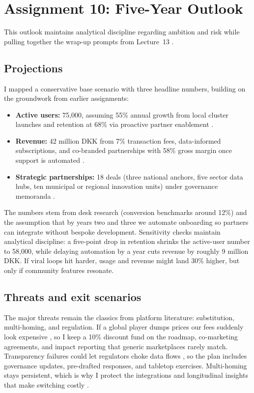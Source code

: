 \section*{Assignment 10: Five-Year Outlook}

This outlook maintains analytical discipline regarding ambition and risk while pulling together the wrap-up prompts from Lecture~13 \citep{Lecture13}.

\subsection*{Projections}
I mapped a conservative base scenario with three headline numbers, building on the groundwork from earlier assignments:
\begin{itemize}
  \item \textbf{Active users:} 75,000, assuming 55\% annual growth from local cluster launches and retention at 68\% via proactive partner enablement \citep{Choudary2016,Srnicek2017}.
  \item \textbf{Revenue:} 42 million DKK from 7\% transaction fees, data-informed subscriptions, and co-branded partnerships with 58\% gross margin once support is automated \citep{ShapiroVarian1999}.
  \item \textbf{Strategic partnerships:} 18 deals (three national anchors, five sector data hubs, ten municipal or regional innovation units) under governance memoranda \citep{Reillier2017}.
\end{itemize}

The numbers stem from desk research (conversion benchmarks around 12\%) and the assumption that by years two and three we automate onboarding so partners can integrate without bespoke development. Sensitivity checks maintain analytical discipline: a five-point drop in retention shrinks the active-user number to 58,000, while delaying automation by a year cuts revenue by roughly 9 million DKK. If viral loops hit harder, usage and revenue might land 30\% higher, but only if community features resonate.

\subsection*{Threats and exit scenarios}
The major threats remain the classics from platform literature: substitution, multi-homing, and regulation. If a global player dumps prices our fees suddenly look expensive \citep{Porter2008}, so I keep a 10\% discount fund on the roadmap, co-marketing agreements, and impact reporting that generic marketplaces rarely match. Transparency failures could let regulators choke data flows \citep{Srnicek2017}, so the plan includes governance updates, pre-drafted responses, and tabletop exercises. Multi-homing stays persistent, which is why I protect the integrations and longitudinal insights that make switching costly \citep{FarrellSaloner1986}.

